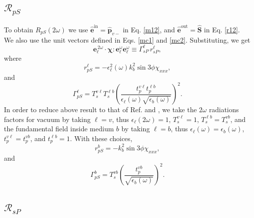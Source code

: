 \documentclass[aps,11pt]{revtex4}
\begin{document}
\subsection{\texorpdfstring{$\mathcal{R}_{pS}$}{RpS}}

To obtain $R_{pS}(2\omega)$ we use
$\hat{\mathbf{e}}^{\mathrm{in}}=\hat{\mathbf{p}}_{v-}$ in Eq. \eqref{m12}, and
$\hat{\mathbf{e}}^{\mathrm{out}}=\hat{\mathbf{S}}$ in Eq. \eqref{r12}. We also
use the unit vectors defined in Eqs. \eqref{mc1} and
\eqref{mc2}. Substituting, we get
\begin{equation}
\mathbf{e}^{\,2\omega}_{\ell}\cdot
\boldsymbol{\chi}:\mathbf{e}^\omega_{\ell}\mathbf{e}^\omega_{\ell}
\equiv\Gamma^{\ell}_{sP}\, r^{\ell}_{sP},
\end{equation}
where
\begin{equation}
r^{\ell}_{pS}
= -\epsilon^{2}_{\ell}(\omega)k^{2}_{b}\sin3\phi\chi_{xxx},
\end{equation} 
and  
\begin{equation}
\Gamma^{\ell}_{pS} =
T^{v\ell}_{s}T^{\ell b}_{s}\left(\frac{t^{v\ell}_{p}t^{\ell b}_{p}}
      {\epsilon_{\ell}(\omega)\sqrt{\epsilon_{b}(\omega)}}\right)^{2}.
\end{equation} 
In order to reduce above result to that of Ref. \cite{mizrahiJOSA88} and
\cite{sipePRB87},  we take the $2\omega$ radiations factors for vacuum by
taking $\ell=v$, thus $\epsilon_{\ell}(2\omega)=1$, $T^{v\ell}_{s}=1$,
$T^{\ell b}_{s}=T^{vb}_{s}$, and the fundamental field inside medium $b$ by
taking $\ell=b$, thus $\epsilon_{\ell}(\omega)=\epsilon_{b}(\omega)$,
$t^{v\ell}_{p}=t^{vb}_{p}$, and $t^{\ell b}_{p}=1$. With these choices,
\begin{equation}
r^{b}_{pS} = -k^{2}_{b}\sin3\phi\chi_{xxx},
\end{equation} 
and 
\begin{equation}
\Gamma^{b}_{pS} =
T^{vb}_{s}
\left(
\frac{t^{vb}_{p}}{\sqrt{\epsilon_{b}(\omega)}}
\right)^{2}.  
\end{equation} 


\subsection{\texorpdfstring{$\mathcal{R}_{sP}$}{RsP}}
\end{document}
